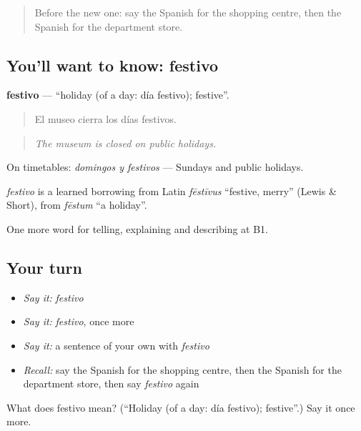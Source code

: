 \begin{quote}
Before the new one: say the Spanish for the shopping centre, then the Spanish for the department store.
\end{quote}

\subsection*{You'll want to know: festivo}
\textbf{festivo} — \textquotedblleft{}holiday (of a day: día festivo); festive\textquotedblright{}.

\begin{quote}
El museo cierra los días festivos.
\end{quote}

\begin{quote}
\emph{The museum is closed on public holidays.}
\end{quote}

On timetables: \emph{domingos y festivos} — Sundays and public holidays.

\begin{cousinweb}
\emph{festivo} is a learned borrowing from Latin \emph{fēstīvus} \textquotedblleft{}festive, merry\textquotedblright{} (Lewis \& Short), from \emph{fēstum} \textquotedblleft{}a holiday\textquotedblright{}.
\end{cousinweb}

\begin{grammarlens}[title={What you've built}]
One more word for telling, explaining and describing at B1.
\end{grammarlens}

\subsection*{Your turn}
\begin{itemize}
\raggedright
  \item \emph{Say it:} \emph{festivo}
  \item \emph{Say it:} \emph{festivo}, once more
  \item \emph{Say it:} a sentence of your own with \emph{festivo}
  \item \emph{Recall:} say the Spanish for the shopping centre, then the Spanish for the department store, then say \emph{festivo} again
\end{itemize}

\begin{tcolorbox}[breakable,colback=teal!4,colframe=teal!35!black,title={Before you move on}]
What does festivo mean? (\textquotedblleft{}Holiday (of a day: día festivo); festive\textquotedblright{}.) Say it once more.
\end{tcolorbox}

